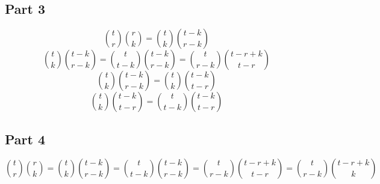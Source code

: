 \subsection{Part 3}\label{subsec:part-3}
\begin{equation}
    \binom{t}{r} \binom{r}{k} = \binom{t}{k} \binom{t-k}{r-k}
\end{equation}
\begin{equation}
    \binom{t}{k} \binom{t-k}{r-k} = \binom{t}{t-k} \binom{t-k}{r-k} = \binom{t}{r-k} \binom{t-r+k}{t-r}
\end{equation}
\begin{equation}
    \binom{t}{k} \binom{t-k}{r-k} = \binom{t}{k} \binom{t-k}{t-r}
\end{equation}
\begin{equation}
    \binom{t}{k} \binom{t-k}{t-r} = \binom{t}{t-k} \binom{t-k}{t-r}
\end{equation}
\subsection{Part 4}\label{subsec:part-4}
\begin{equation}
    \binom{t}{r} \binom{r}{k} = \binom{t}{k} \binom{t-k}{r-k} = \binom{t}{t-k} \binom{t-k}{r-k} = \binom{t}{r-k} \binom{t-r+k}{t-r} = \binom{t}{r-k} \binom{t-r+k}{k}
\end{equation}